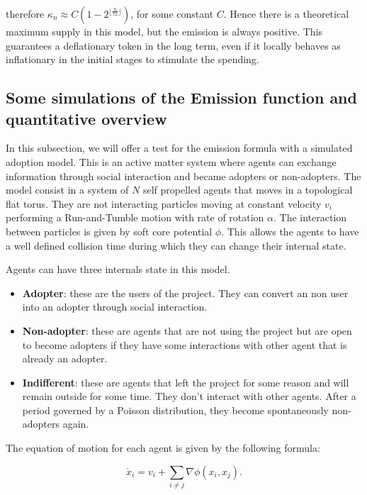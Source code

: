 \documentclass[11pt]{amsart}
\numberwithin{equation}{section}
\theoremstyle{definition}
\theoremstyle{remark}
\renewcommand{\_}[1]{_{\left( #1 \right)}}
\renewcommand{\^}[1]{^{\left( #1 \right)}}
\begin{document}
therefore $\kappa_n \approx C (1- 2^{\lfloor \frac{n}{72}\rfloor})$, for some constant $C$. Hence there is a theoretical maximum supply in this model, but the emission is always positive. This guarantees a deflationary token in the long term, even if it locally behaves as inflationary in the initial stages to stimulate the spending. 

\subsection{Some simulations of the Emission function and quantitative overview}


In this subsection, we will offer a test for the emission formula with a simulated adoption model. This is an active matter system where agents can exchange information through social interaction and became adopters or non-adopters.
The model consist in a system of $N$ self propelled agents that moves in a topological flat torus.
They are not interacting particles moving at constant velocity $v_{i}$ performing a Run-and-Tumble motion with rate of rotation $\alpha$. The interaction between particles is given by soft core potential $\phi$. This allows the agents to have a well defined collision time during which they can change their internal state. 

Agents can have three internals state in this model. 

\begin{itemize}
	\item \textbf{Adopter}: these are the users of the project. They can convert an non user into an adopter through social interaction.  
	\item \textbf{Non-adopter}: these are agents that are not using the project but are open to become adopters if they have some interactions with other agent that is already an adopter. 
	\item \textbf{Indifferent}: these are agents that left the project for some reason and will remain outside for some time. They don't interact with other agents. After a period governed by a Poisson distribution, they become spontaneously non-adopters again. 
\end{itemize}


The equation of motion for each agent is given by the following formula:

\begin{equation*}
\dot{x}_i = v_{i} +  \sum_{i \neq j} \nabla \phi (x_i, x_j).
\end{equation*}
\end{document}
